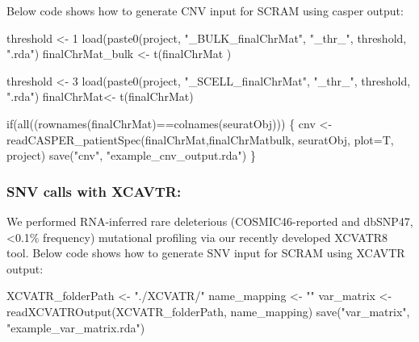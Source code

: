 \documentclass[]{article}
\newcommand{\hlnum}[1]{\textcolor[rgb]{0.816,0.125,0.439}{#1}}%
\newcommand{\hlstr}[1]{\textcolor[rgb]{0.251,0.627,0.251}{#1}}%
\newcommand{\hlstd}[1]{\textcolor[rgb]{0.251,0.251,0.251}{#1}}%
\newcommand{\hlkwd}[1]{\textcolor[rgb]{0.878,0.439,0.125}{#1}}%
\newenvironment{Shaded}{\begin{myshaded}}{\end{myshaded}}
\newcommand{\DecValTok}[1]{\hlnum{#1}}
\newcommand{\SpecialCharTok}[1]{\hlstr{#1}}
\newcommand{\StringTok}[1]{\hlstr{#1}}
\newcommand{\OtherTok}[1]{{#1}}
\newcommand{\FunctionTok}[1]{\hlstd{#1}}
\newcommand{\ControlFlowTok}[1]{\hlkwd{#1}}
\newcommand{\AttributeTok}[1]{{#1}}
\newcommand{\NormalTok}[1]{\hlstd{#1}}
\begin{document}
Below code shows how to generate CNV input for SCRAM using casper output:

\begin{Shaded}
\begin{Highlighting}[]

\NormalTok{threshold }\OtherTok{\textless{}{-}} \DecValTok{1}
\FunctionTok{load}\NormalTok{(}\FunctionTok{paste0}\NormalTok{(project, }\StringTok{"\_BULK\_finalChrMat"}\NormalTok{, }\StringTok{"\_thr\_"}\NormalTok{, threshold, }\StringTok{".rda"}\NormalTok{)}
\NormalTok{finalChrMat\_bulk }\OtherTok{\textless{}{-}} \FunctionTok{t}\NormalTok{(finalChrMat )}

\NormalTok{threshold }\OtherTok{\textless{}{-}} \DecValTok{3}
\FunctionTok{load}\NormalTok{(}\FunctionTok{paste0}\NormalTok{(project, }\StringTok{"\_SCELL\_finalChrMat"}\NormalTok{, }\StringTok{"\_thr\_"}\NormalTok{, threshold, }\StringTok{".rda"}\NormalTok{)}
\NormalTok{finalChrMat}\OtherTok{\textless{}{-}} \FunctionTok{t}\NormalTok{(finalChrMat)}

\ControlFlowTok{if}\NormalTok{(}\FunctionTok{all}\NormalTok{((}\FunctionTok{rownames}\NormalTok{(finalChrMat)}\SpecialCharTok{==}\FunctionTok{colnames}\NormalTok{(seuratObj)))}
\NormalTok{\{}
\NormalTok{  cnv }\OtherTok{\textless{}{-}} \FunctionTok{readCASPER\_patientSpec}\NormalTok{(finalChrMat,finalChrMatbulk, seuratObj, }\AttributeTok{plot=}\NormalTok{T, project)}
  \FunctionTok{save}\NormalTok{(}\StringTok{"cnv"}\NormalTok{, }\StringTok{"example\_cnv\_output.rda"}\NormalTok{)}
\NormalTok{\}}
\end{Highlighting}
\end{Shaded}

\hypertarget{snv-calls-with-xcavtr}{%
\subsubsection{SNV calls with XCAVTR:}\label{snv-calls-with-xcavtr}}

We performed RNA-inferred rare deleterious (COSMIC46-reported and dbSNP47, \textless0.1\% frequency) mutational profiling via our recently developed XCVATR8 tool.
Below code shows how to generate SNV input for SCRAM using XCAVTR output:

\begin{Shaded}
\begin{Highlighting}[]
\NormalTok{XCVATR\_folderPath }\OtherTok{\textless{}{-}} \StringTok{"./XCVATR/"}
\NormalTok{name\_mapping }\OtherTok{\textless{}{-}} \StringTok{""}
\NormalTok{var\_matrix }\OtherTok{\textless{}{-}} \FunctionTok{readXCVATROutput}\NormalTok{(XCVATR\_folderPath, name\_mapping)}
\FunctionTok{save}\NormalTok{(}\StringTok{"var\_matrix"}\NormalTok{, }\StringTok{"example\_var\_matrix.rda"}\NormalTok{)}
\end{Highlighting}
\end{Shaded}
\end{document}
